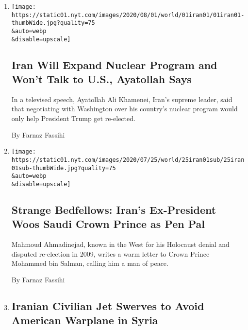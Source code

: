 \begin{enumerate}
\def\labelenumi{\arabic{enumi}.}
\item
  \href{/2020/08/01/world/asia/iran-khamenei-us-sanctions.html}{}

  \texttt{[image: https://static01.nyt.com/images/2020/08/01/world/01iran01/01iran01-thumbWide.jpg?quality=75\\\&auto=webp\\\&disable=upscale]}

  \hypertarget{iran-will-expand-nuclear-program-and-wont-talk-to-us-ayatollah-says}{%
  \subsection{Iran Will Expand Nuclear Program and Won't Talk to U.S.,
  Ayatollah
  Says}\label{iran-will-expand-nuclear-program-and-wont-talk-to-us-ayatollah-says}}

  In a televised speech, Ayatollah Ali Khamenei, Iran's supreme leader,
  said that negotiating with Washington over his country's nuclear
  program would only help President Trump get re-elected.

  By Farnaz Fassihi
\item
  \href{/2020/07/26/world/middleeast/iran-Ahmadinejad-Salman-letter.html}{}

  \texttt{[image: https://static01.nyt.com/images/2020/07/25/world/25iran01sub/25iran01sub-thumbWide.jpg?quality=75\\\&auto=webp\\\&disable=upscale]}

  \hypertarget{strange-bedfellows-irans-ex-president-woos-saudi-crown-prince-as-pen-pal}{%
  \subsection{Strange Bedfellows: Iran's Ex-President Woos Saudi Crown
  Prince as Pen
  Pal}\label{strange-bedfellows-irans-ex-president-woos-saudi-crown-prince-as-pen-pal}}

  Mahmoud Ahmadinejad, known in the West for his Holocaust denial and
  disputed re-election in 2009, writes a warm letter to Crown Prince
  Mohammed bin Salman, calling him a man of peace.

  By Farnaz Fassihi
\item
  \href{/2020/07/23/world/middleeast/iran-warplanes-syria.html}{}

  \hypertarget{iranian-civilian-jet-swerves-to-avoid-american-warplane-in-syria}{%
  \subsection{Iranian Civilian Jet Swerves to Avoid American Warplane in
  Syria}\label{iranian-civilian-jet-swerves-to-avoid-american-warplane-in-syria}}


\end{enumerate}
